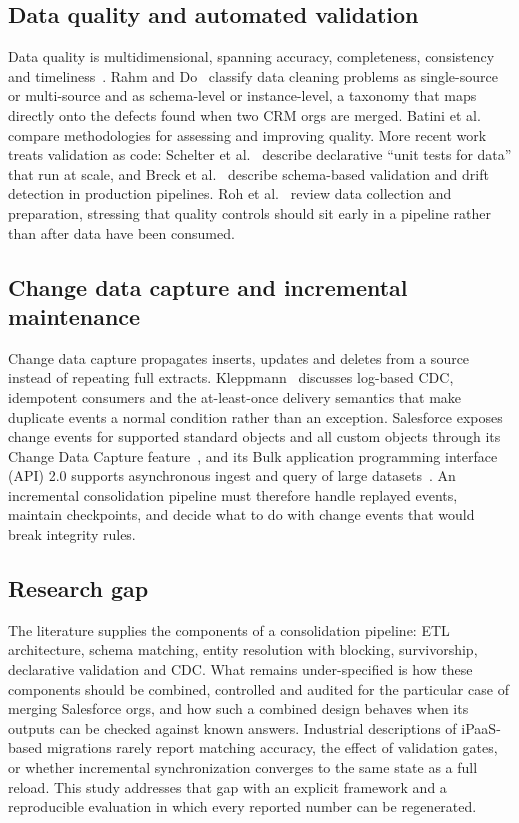 \subsection{Data quality and automated validation}\label{sec:2.3}

Data quality is multidimensional, spanning accuracy, completeness, consistency and timeliness~\cite{wang1996}. Rahm and Do~\cite{rahm2000} classify data cleaning problems as single-source or multi-source and as schema-level or instance-level, a taxonomy that maps directly onto the defects found when two CRM orgs are merged. Batini et al.~\cite{batini2009} compare methodologies for assessing and improving quality. More recent work treats validation as code: Schelter et al.~\cite{schelter2018} describe declarative ``unit tests for data'' that run at scale, and Breck et al.~\cite{breck2019} describe schema-based validation and drift detection in production pipelines. Roh et al.~\cite{roh2021} review data collection and preparation, stressing that quality controls should sit early in a pipeline rather than after data have been consumed.

\subsection{Change data capture and incremental maintenance}\label{sec:2.4}

Change data capture propagates inserts, updates and deletes from a source instead of repeating full extracts. Kleppmann~\cite{kleppmann2017} discusses log-based CDC, idempotent consumers and the at-least-once delivery semantics that make duplicate events a normal condition rather than an exception. Salesforce exposes change events for supported standard objects and all custom objects through its Change Data Capture feature~\cite{salesforce2026cdc}, and its Bulk application programming interface (API) 2.0 supports asynchronous ingest and query of large datasets~\cite{salesforce2026bulk}. An incremental consolidation pipeline must therefore handle replayed events, maintain checkpoints, and decide what to do with change events that would break integrity rules.

\subsection{Research gap}\label{sec:2.5}

The literature supplies the components of a consolidation pipeline: ETL architecture, schema matching, entity resolution with blocking, survivorship, declarative validation and CDC. What remains under-specified is how these components should be combined, controlled and audited for the particular case of merging Salesforce orgs, and how such a combined design behaves when its outputs can be checked against known answers. Industrial descriptions of iPaaS-based migrations rarely report matching accuracy, the effect of validation gates, or whether incremental synchronization converges to the same state as a full reload. This study addresses that gap with an explicit framework and a reproducible evaluation in which every reported number can be regenerated.

